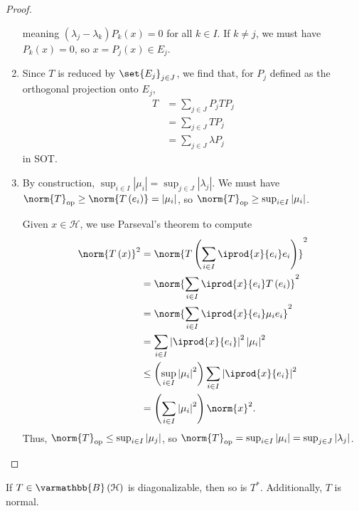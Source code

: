 \documentclass[10pt]{mypackage}
\renewcommand*{\mathbb}[1]{\varmathbb{#1}}
\newcommand{\B}{\mathbb{B}}
\begin{document}
\begin{proof}
\begin{enumerate}[(1)]
      meaning $\left(\lambda_j - \lambda_k\right)P_k\left(x\right) = 0$ for all $k\in I$. If $k\neq j$, we must have $P_k\left(x\right) = 0$, so $x = P_j\left(x\right) \in E_j$.
    \item Since $T$ is reduced by $\set{E_j}_{j\in J}$, we find that, for $P_j$ defined as the orthogonal projection onto $E_j$,
      \begin{align*}
        T &= \sum_{j\in J}P_jTP_j\\
          &= \sum_{j\in J}TP_j\\
          &= \sum_{j\in J}\lambda P_j
      \end{align*}
      in SOT.
    \item By construction, $\sup_{i\in I}\left\vert \mu_i \right\vert = \sup_{j\in J}\left\vert \lambda_j \right\vert$. We must have $\norm{T}_{\text{op}} \geq \norm{T\left(e_i\right)} = \left\vert \mu_i \right\vert$, so $\norm{T}_{\text{op}} \geq \sup_{i\in I}\left\vert \mu_i \right\vert$.\newline

      Given $x\in \mathcal{H}$, we use Parseval's theorem to compute
      \begin{align*}
        \norm{T\left(x\right)}^2 &= \norm{T\left(\sum_{i\in I} \iprod{x}{e_i}e_i\right)}^2\\
                                 &= \norm{\sum_{i\in I} \iprod{x}{e_i}T\left(e_i\right)}^2\\
                                 &= \norm{\sum_{i\in I} \iprod{x}{e_i}\mu_ie_i}^2\\
                                 &= \sum_{i\in I}\left\vert \iprod{x}{e_i} \right\vert^2 \left\vert \mu_i \right\vert^2\\
                                 &\leq \left(\sup_{i\in I}\left\vert \mu_i \right\vert^2\right)\sum_{i\in I} \left\vert \iprod{x}{e_i} \right\vert^2\\
                                 &= \left(\sum_{i\in I}\left\vert \mu_i \right\vert^2\right)\norm{x}^2.
      \end{align*}
      Thus, $\norm{T}_{\text{op}} \leq \sup_{i\in I}\left\vert \mu_j \right\vert$, so $\norm{T}_{\text{op}} = \sup_{i\in I}\left\vert \mu_i \right\vert = \sup_{j\in J}\left\vert \lambda_j \right\vert$.
  \end{enumerate}
\end{proof}
\begin{corollary}
  If $T\in \B\left(\mathcal{H}\right)$ is diagonalizable, then so is $T^{\ast}$. Additionally, $T$ is normal.
\end{corollary}
\end{document}
